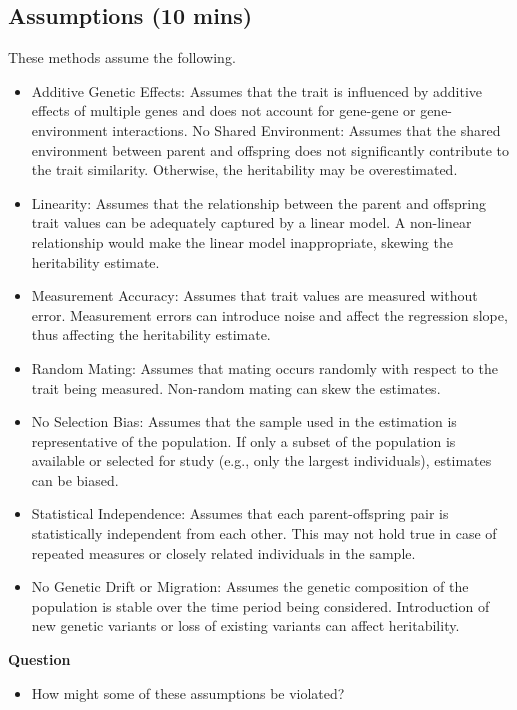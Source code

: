\documentclass[
  a4paper]{book}
\providecommand{\tightlist}{%
  \setlength{\itemsep}{0pt}\setlength{\parskip}{0pt}}
\begin{document}
\subsection{Assumptions (10 mins)}\label{assumptions-10-mins}

These methods assume the following.

\begin{itemize}
\tightlist
\item
  Additive Genetic Effects: Assumes that the trait is influenced by additive effects of multiple genes and does not account for gene-gene or gene-environment interactions.
  No Shared Environment: Assumes that the shared environment between parent and offspring does not significantly contribute to the trait similarity. Otherwise, the heritability may be overestimated.
\item
  Linearity: Assumes that the relationship between the parent and offspring trait values can be adequately captured by a linear model. A non-linear relationship would make the linear model inappropriate, skewing the heritability estimate.
\item
  Measurement Accuracy: Assumes that trait values are measured without error. Measurement errors can introduce noise and affect the regression slope, thus affecting the heritability estimate.
\item
  Random Mating: Assumes that mating occurs randomly with respect to the trait being measured. Non-random mating can skew the estimates.
\item
  No Selection Bias: Assumes that the sample used in the estimation is representative of the population. If only a subset of the population is available or selected for study (e.g., only the largest individuals), estimates can be biased.
\item
  Statistical Independence: Assumes that each parent-offspring pair is statistically independent from each other. This may not hold true in case of repeated measures or closely related individuals in the sample.
\item
  No Genetic Drift or Migration: Assumes the genetic composition of the population is stable over the time period being considered. Introduction of new genetic variants or loss of existing variants can affect heritability.
\end{itemize}

\textbf{Question}

\begin{itemize}
\tightlist
\item
  How might some of these assumptions be violated?
\end{itemize}
\end{document}
